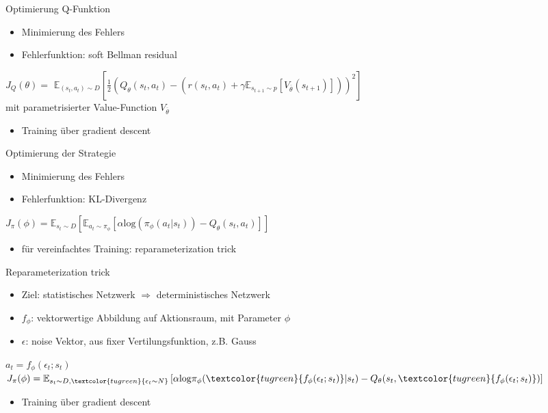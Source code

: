 \begin{frame}{Optimierung Q-Funktion}
\begin{itemize}
\item Minimierung des Fehlers
\item Fehlerfunktion: soft Bellman residual \\[12pt]
\end{itemize}
 $J_{Q}(\theta)=$
$\mathbb{E}_{(s_{t},a_{t})\sim D}\left[\frac{1}{2}(Q_{\theta}(s_{t},a_{t})-(r(s_{t},a_{t})+\gamma \mathbb{E}_{s_{t+1}\sim p}[V_{\overline{\theta}}(s_{t+1})]))^{2}\right]$ \\[12pt]

mit parametrisierter Value-Function $V_{\overline{\theta}}$ \\[12pt]

\begin{itemize}
\item Training über gradient descent
\end{itemize}
\end{frame}

\begin{frame}{Optimierung der Strategie}
\begin{itemize}
\item Minimierung des Fehlers
\item Fehlerfunktion: KL-Divergenz \\[12pt]
\end{itemize}
$J_{\pi}(\phi)=\mathbb{E}_{s_{t}\sim D}\left[\mathbb{E}_{a_{t}\sim \pi_{\phi}}\left[\alpha \mathrm{log}(\pi_{\phi}(a_{t}|s_{t}))-Q_{\theta}(s_{t},a_{t})\right]\right]$ \\[12pt]
\begin{itemize}
\item für vereinfachtes Training: reparameterization trick
\end{itemize}
\end{frame}

\begin{frame}{Reparameterization trick}
\begin{itemize}
\item Ziel: statistisches Netzwerk $\Rightarrow$ deterministisches Netzwerk
\item $f_{\phi}$: vektorwertige Abbildung auf Aktionsraum, mit Parameter $\phi$
\item $\epsilon$: noise Vektor, aus fixer Vertilungsfunktion, z.B. Gauss \\[12pt]
\end{itemize}
\textcolor{tugreen}{$a_{t}=f_{\phi}(\epsilon_{t};s_{t})$} \\[6pt]
$J_{\pi}(\phi)=\mathbb{E}_{s_{t}\sim D,\textcolor{tugreen}{\epsilon_{t}\sim N}}\left[\alpha\mathrm{log}\pi_{\phi}(\textcolor{tugreen}{f_{\phi}(\epsilon_{t};s_{t})}|s_{t})-Q_{\theta}(s_{t},\textcolor{tugreen}{f_{\phi}(\epsilon_{t};s_{t})})\right]$ \\[12pt]

\begin{itemize}
\item Training über gradient descent
\end{itemize}
\end{frame}

